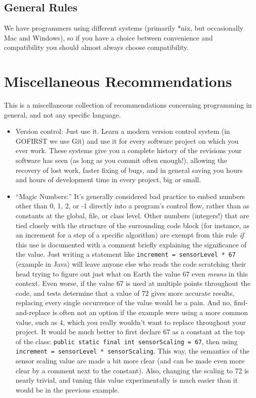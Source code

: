 \documentclass[12pt]{article}
\newcommand{\code}[1]{\texttt{#1}}
\begin{document}
\subsection{General Rules} We have programmers using different systems (primarily *nix, but occasionally Mac and Windows), so if you have a choice between convenience and compatibility you should almost always choose compatibility.

\section{Miscellaneous Recommendations}
This is a miscellaneous collection of recommendations concerning programming in general, and not any specific language.
\begin{itemize}
    \item Version control: Just use it. Learn a modern version control system (in GOFIRST we use Git) and use it for every software project on which you ever work. These systems give you a complete history of the revisions your software has seen (as long as you commit often enough!), allowing the recovery of lost work, faster fixing of bugs, and in general saving you hours and hours of development time in every project, big or small.
    \item ``Magic Numbers:'' It's generally considered bad practice to embed numbers other than 0, 1, 2, or -1 directly into a program's control flow, rather than as constants at the global, file, or class level. Other numbers (integers!) that are tied closely with the structure of the surrounding code block (for instance, as an increment for a step of a specific algorithm) are exempt from this rule \emph{if} this use is documented with a comment briefly explaining the significance of the value. Just writing a statement like \code{increment = sensorLevel * 67} (example in Java) will leave anyone else who reads the code scratching their head trying to figure out just what on Earth the value 67 even \emph{means} in this context. Even worse, if the value 67 is used at multiple points throughout the code, and tests determine that a value of 72 gives more accurate results, replacing every single occurrence of the value would be a pain. And no, find-and-replace is often not an option if the example were using a more common value, such as 4, which you really wouldn't want to replace throughout your project. It would be much better to first declare 67 as a constant at the top of the class: \code{public static final int sensorScaling = 67}, then using \code{increment = sensorLevel * sensorScaling}. This way, the semantics of the sensor scaling value are made a bit more clear (and can be made even more clear by a comment next to the constant). Also, changing the scaling to 72 is nearly trivial, and tuning this value experimentally is much easier than it would be in the previous example.

\end{itemize}
\end{document}
